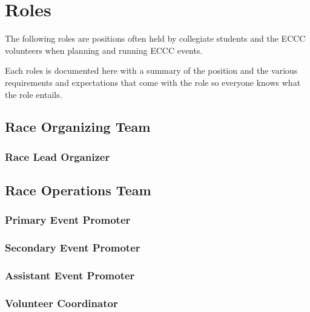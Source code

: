 \setchapterpreamble[u]{\margintoc}
\chapter{Roles}

The following roles are positions often held by collegiate students and the ECCC volunteers
when planning and running ECCC events.

Each roles is documented here with a summary of the position
and the various requirements and expectations that come with the role
so everyone knows what the role entails.



\section{Race Organizing Team}
\label{role:race_org_team}

\subsection{Race Lead Organizer}
\label{role:lead_org}

\section{Race Operations Team}
\label{role:race_ops_team}

\subsection{Primary Event Promoter}
\label{role:primary_promoter}

\subsection{Secondary Event Promoter}
\label{role:secondary_promoter}

\subsection{Assistant Event Promoter}
\label{role:assistant_promoter}

\subsection{Volunteer Coordinator}
\label{role:volunteer_coordinator}

